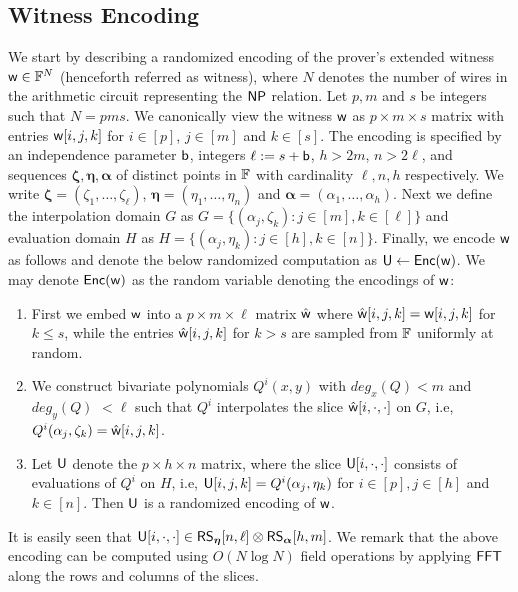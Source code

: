 \subsection{Witness Encoding}\label{sec:witencoding}
We start by describing a randomized encoding of the prover's extended witness
$\mathsf{w}\in \mathbb{F}^N$ (henceforth referred as witness), where $N$ denotes the number
of wires in the arithmetic circuit representing the $\mathsf{NP}$ relation. Let $p,m$ and $s$ be
integers such that $N=pms$. We canonically view the
witness $\mathsf{w}$ 
as $p\times m\times s$ matrix with entries $\mathsf{w}[i,j,k]$ for $i\in [p]$,
$j\in [m]$ and $k\in [s]$. The encoding is specified by an independence 
parameter $\mathsf{b}$, integers $\ell := s+\mathsf{b}$, $h>2m$, $n>2\ell$, and sequences
$\bm{\zeta},\bm{\eta},\bm{\alpha}$ of distinct points in $\mathbb{F}$ with cardinality 
$\ell,n,h$ respectively. We write $\bm{\zeta}=(\zeta_1,\ldots,\zeta_\ell)$,
$\bm{\eta}=(\eta_1,\ldots,\eta_n)$ and $\bm{\alpha}=(\alpha_1,\ldots,\alpha_h)$. 
Next we define the interpolation domain $G$ as $G=\{(\alpha_j,\zeta_k): j\in[m],
k\in [\ell]\}$ and evaluation domain $H$ as $H=\{(\alpha_j,\eta_k): j\in [h],
k\in [n]\}$. Finally, we encode $\mathsf{w}$ as follows and denote the below randomized computation as $\mathsf{U}\gets \mathsf{Enc}(\mathsf{w})$.
 We may denote $\mathsf{Enc}(\mathsf{w})$ as the random variable denoting the encodings of $\mathsf{w}$:
\begin{enumerate}[{\rm (i)}]
\item First we embed $\mathsf{w}$ into a $p\times m\times \ell$ matrix $\hat{\mathsf{w}}$
where $\hat{\mathsf{w}}[i,j,k]=\mathsf{w}[i,j,k]$ for $k\leq s$, while the entries
$\hat{\mathsf{w}}[i,j,k]$ for $k>s$ are sampled from $\mathbb{F}$ uniformly at random.
\item We construct bivariate polynomials $Q^i(x,y)$ with $deg_x(Q)<m$ and
$deg_y(Q) $ $<\ell$ such that $Q^i$ interpolates the slice
$\hat{\mathsf{w}}[i,\cdot,\cdot]$ on $G$, i.e,
$Q^i(\alpha_j,\zeta_k)=\hat{\mathsf{w}}[i,j,k]$. 
\item Let $\mathsf{U}$ denote the $p\times h\times n$ matrix, where the slice
$\mathsf{U}[i,\cdot,\cdot]$ consists of evaluations of $Q^i$ on $H$, i.e,
$\mathsf{U}[i,j,k]=Q^i(\alpha_j,\eta_k)$ for $i\in [p], j\in [h]$ and $k\in [n]$.
Then $\mathsf{U}$ is a randomized encoding of $\mathsf{w}$.
\end{enumerate}
 It is easily seen
that $\mathsf{U}[i,\cdot,\cdot]\in \mathsf{RS}_{\bm{\eta}}[n,\ell]\otimes \mathsf{RS}_{\bm{\alpha}}[h,m]$. 
We remark that the above
encoding can be computed using $O(N\log N)$ field operations by applying $\mathsf{FFT}$ along the rows and columns of the slices. %
